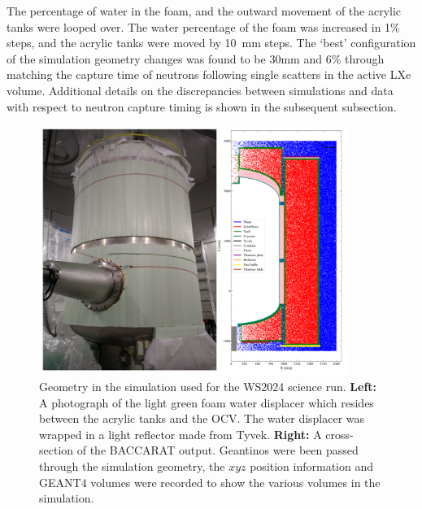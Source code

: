 The percentage of water in the foam, and the outward movement of the acrylic tanks were looped over.
The water percentage of the foam was increased in 1\% steps, and the acrylic tanks were moved by 10~mm steps.
The `best' configuration of the simulation geometry changes was found to be 30mm and 6\% through matching the capture time of neutrons following single scatters in the active LXe volume. Additional details on the discrepancies between simulations and data with respect to neutron capture timing is shown in the subsequent subsection.
\begin{figure}[ht!]
	\centering
	\includegraphics[width=0.9\textwidth]{figures/VetoEfficiency/FoamImgAndSimGeoTogether.png}
	\caption{Geometry in the simulation used for the WS2024 science run. \textbf{Left:} A photograph of the light green foam water displacer which resides between the acrylic tanks and the OCV. The water displacer was wrapped in a light reflector made from Tyvek. \textbf{Right:} A cross-section of the BACCARAT output. Geantinos were been passed through the simulation geometry, the $xyz$ position information and GEANT4 volumes were recorded to show the various volumes in the simulation.}
	\label{fig:VetoEff/od_geometry_for_sr3}
\end{figure}

